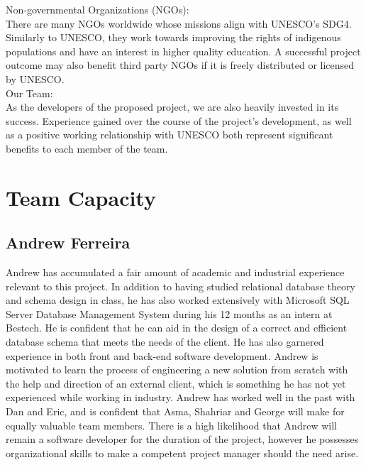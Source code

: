 \documentclass[11pt]{article}
\begin{document}
Non-governmental Organizations (NGOs): \\
There are many NGOs worldwide whose missions align with UNESCO's SDG4. Similarly to UNESCO, they work towards improving the rights of indigenous populations and have an interest in higher quality education. A successful project outcome may also benefit third party NGOs if it is freely distributed or licensed by UNESCO. \\

Our Team: \\
As the developers of the proposed project, we are also heavily invested in its success. Experience gained over the course of the project's development, as well as a positive working relationship with UNESCO both represent significant benefits to each member of the team. \\

\newpage

\section{Team Capacity}

\subsection{\textbf{Andrew Ferreira}}
Andrew has accumulated a fair amount of academic and industrial experience relevant to this project. In addition to having studied relational database theory and schema design in class, he has also worked extensively with Microsoft SQL Server Database Management System during his 12 months as an intern at Bestech. He is confident that he can aid in the design of a correct and efficient database schema that meets the needs of the client. He has also garnered experience in both front and back-end software development. Andrew is motivated to learn the process of engineering a new solution from scratch with the help and direction of an external client, which is something he has not yet experienced while working in industry. Andrew has worked well in the past with Dan and Eric, and is confident that Asma, Shahriar and George will make for equally valuable team members. There is a high likelihood that Andrew will remain a software developer for the duration of the project, however he possesses organizational skills to make a competent project manager should the need arise. \\
\end{document}

